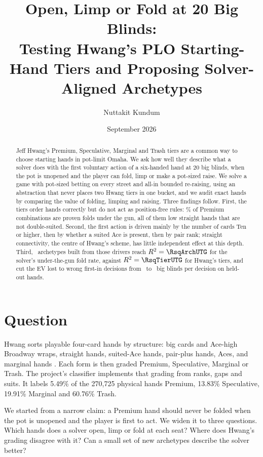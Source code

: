 \documentclass[10pt]{article}
\title{Open, Limp or Fold at 20 Big Blinds:\\
Testing Hwang's PLO Starting-Hand Tiers and Proposing Solver-Aligned Archetypes}
\author{Nuttakit Kundum}
\date{September 2026}
\begin{document}
\maketitle

\begin{abstract}
Jeff Hwang's Premium, Speculative, Marginal and Trash tiers are a common way to choose starting
hands in pot-limit Omaha. We ask how well they describe what a solver does with the first voluntary
action of a six-handed hand at 20 big blinds, when the pot is unopened and the player can fold,
limp or make a pot-sized raise. We solve a game with pot-sized betting on every street and all-in
bounded re-raising, using an abstraction that never places two Hwang tiers in one bucket, and we
audit exact hands by comparing the value of folding, limping and raising. Three findings follow.
First, the tiers order hands correctly but do not act as position-free rules: \PremFoldUTG\% of
Premium combinations are proven folds under the gun, all of them low straight hands that are not
double-suited. Second, the first action is driven mainly by the number of cards Ten or higher,
then by whether a suited Ace is present, then by pair rank; straight connectivity, the centre of
Hwang's scheme, has little independent effect at this depth. Third, \ArchCount\ archetypes built
from those drivers reach $R^2 = \RsqArchUTG$ for the solver's under-the-gun fold rate, against
$R^2 = \RsqTierUTG$ for Hwang's tiers, and cut the EV lost to wrong first-in decisions from
\LossHwangUTG\ to \LossArchUTG\ big blinds per decision on held-out hands.
\end{abstract}

\section{Question}
Hwang sorts playable four-card hands by structure: big cards and Ace-high Broadway wraps,
straight hands, suited-Ace hands, pair-plus hands, Aces, and marginal hands \cite{hwang}. Each
form is then graded Premium, Speculative, Marginal or Trash. The project's classifier implements
that grading from ranks, gaps and suits. It labels 5.49\% of the 270{,}725 physical hands Premium,
13.83\% Speculative, 19.91\% Marginal and 60.76\% Trash.

We started from a narrow claim: a Premium hand should never be folded when the pot is unopened and
the player is first to act. We widen it to three questions. Which hands does a solver open, limp or
fold at each seat? Where does Hwang's grading disagree with it? Can a small set of new archetypes
describe the solver better?
\end{document}

